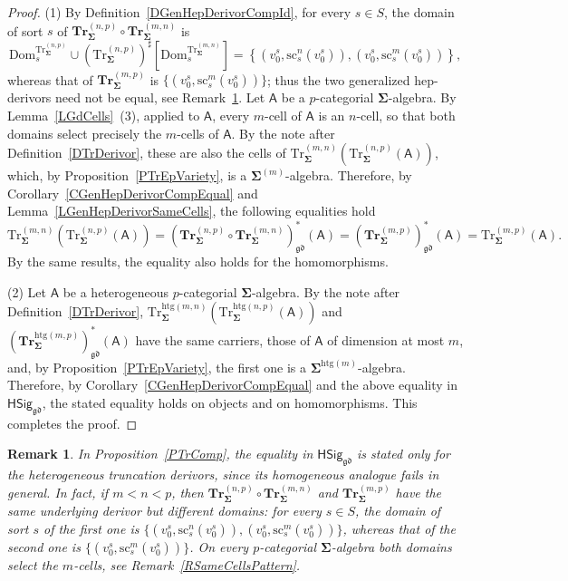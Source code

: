 \documentclass[a4paper, reqno]{amsbook}
\newcommand{\sig}[1]{\mathbf{#1}}             %
\newcommand{\calg}[1]{\boldsymbol{\mathsf{#1}}} %
\newcommand{\Dom}{\mathrm{Dom}}
\newcommand{\gd}{\mathfrak{gd}}              %
\newcommand{\htg}{\mathrm{htg}}                %
\newcommand{\src}{\mathrm{sc}}
\newcommand{\Tr}{\mathrm{Tr}}
\newcommand{\bTr}{\mathbf{Tr}}
\theoremstyle{plain}
\newtheorem{remark}[theorem]{Remark}
\theoremstyle{definition}
\begin{document}
\begin{proof}
(1) By Definition~\ref{DGenHepDerivorCompId}, for every $s\in S$, the domain of sort $s$ of $\bTr^{(n,p)}_{\sig{\Sigma}}\circ\bTr^{(m,n)}_{\sig{\Sigma}}$ is
\[
\Dom^{\Tr^{(n,p)}_{\sig{\Sigma}}}_{s}\cup\left(\Tr^{(n,p)}_{\sig{\Sigma}}\right)^{\sharp}\left[\Dom^{\Tr^{(m,n)}_{\sig{\Sigma}}}_{s}\right]
=
\left\lbrace\left(v^s_0,\src^n_s(v^s_0)\right),\left(v^s_0,\src^m_s(v^s_0)\right)\right\rbrace,
\]
whereas that of $\bTr^{(m,p)}_{\sig{\Sigma}}$ is $\{(v^s_0,\src^m_s(v^s_0))\}$; thus the two generalized hep-derivors need not be equal, see Remark~\ref{RTrCompHomogeneous}.
Let $\calg{A}$ be a $p$-categorial $\sig{\Sigma}$-algebra.
By Lemma~\ref{LGdCells}~(3), applied to $\calg{A}$, every $m$-cell of $\calg{A}$ is an $n$-cell, so that both domains select precisely the $m$-cells of $\calg{A}$.
By the note after Definition~\ref{DTrDerivor}, these are also the cells of $\Tr^{(m,n)}_{\sig{\Sigma}}(\Tr^{(n,p)}_{\sig{\Sigma}}(\calg{A}))$, which, by Proposition~\ref{PTrEpVariety}, is a $\sig{\Sigma}^{(m)}$-algebra.
Therefore, by Corollary~\ref{CGenHepDerivorCompEqual} and Lemma~\ref{LGenHepDerivorSameCells}, the following equalities hold
$$
\Tr^{(m,n)}_{\sig{\Sigma}}\left(\Tr^{(n,p)}_{\sig{\Sigma}}(\calg{A})\right)
=
\left(\bTr^{(n,p)}_{\sig{\Sigma}}\circ\bTr^{(m,n)}_{\sig{\Sigma}}\right)^{\ast}_{\gd}(\calg{A})
=
\left(\bTr^{(m,p)}_{\sig{\Sigma}}\right)^{\ast}_{\gd}(\calg{A})
=
\Tr^{(m,p)}_{\sig{\Sigma}}(\calg{A}).
$$
By the same results, the equality also holds for the homomorphisms.

(2) Let $\calg{A}$ be a heterogeneous $p$-categorial $\sig{\Sigma}$-algebra.
By the note after Definition~\ref{DTrDerivor}, $\Tr^{\htg(m,n)}_{\sig{\Sigma}}(\Tr^{\htg(n,p)}_{\sig{\Sigma}}(\calg{A}))$ and $(\bTr^{\htg(m,p)}_{\sig{\Sigma}})^{\ast}_{\gd}(\calg{A})$ have the same carriers, those of $\calg{A}$ of dimension at most $m$, and, by Proposition~\ref{PTrEpVariety}, the first one is a $\sig{\Sigma}^{\htg(m)}$-algebra.
Therefore, by Corollary~\ref{CGenHepDerivorCompEqual} and the above equality in $\mathsf{HSig}_{\gd}$, the stated equality holds on objects and on homomorphisms. This completes the proof.
\end{proof}

\begin{remark}\label{RTrCompHomogeneous}
In Proposition~\ref{PTrComp}, the equality in $\mathsf{HSig}_{\gd}$ is stated only for the heterogeneous truncation derivors, since its homogeneous analogue fails in general.
In fact, if $m<n<p$, then $\bTr^{(n,p)}_{\sig{\Sigma}}\circ\bTr^{(m,n)}_{\sig{\Sigma}}$ and $\bTr^{(m,p)}_{\sig{\Sigma}}$ have the same underlying derivor but different domains: for every $s\in S$, the domain of sort $s$ of the first one is $\{(v^s_0,\src^n_s(v^s_0)),(v^s_0,\src^m_s(v^s_0))\}$, whereas that of the second one is $\{(v^s_0,\src^m_s(v^s_0))\}$.
On every $p$-categorial $\sig{\Sigma}$-algebra both domains select the $m$-cells, see Remark~\ref{RSameCellsPattern}.
\end{remark}
\end{document}
